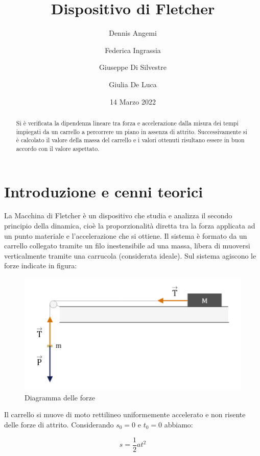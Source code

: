 \documentclass[11pt,a4paper]{article}
\title{Dispositivo di Fletcher}
\author[1]{Dennis Angemi}%
\author[1]{Federica Ingrassia}%
\author[1]{Giuseppe Di Silvestre}%
\author[1]{Giulia De Luca}%
\affil[1]{Dipartimento di Fisica e Astronomia ``Ettore Majorana'' - Università degli Studi di Catania}%
\date{14 Marzo 2022}
\begin{document}
\maketitle

\begin{abstract}
   
Si è verificata la dipendenza lineare tra forza e accelerazione dalla misura dei tempi impiegati da un carrello a percorrere un piano in assenza di attrito. Successivamente si è calcolato il valore della massa del carrello e i valori ottenuti risultano essere in buon accordo con il valore aspettato.
   
\end{abstract}

\section{Introduzione e cenni teorici}
La Macchina di Fletcher è un dispositivo che studia e analizza il secondo principio della dinamica, cioè la proporzionalità diretta tra la forza applicata ad un punto materiale e l'accelerazione che si ottiene.
Il sistema è formato da un carrello collegato tramite un filo inestensibile ad una massa, libera di muoversi verticalmente tramite una carrucola (considerata ideale).
Sul sistema agiscono le forze indicate in figura:

\begin{figure}[H]
\includegraphics[scale=0.3]{force-diagram.png}
\centering
\caption{Diagramma delle forze}
\label{fig:forze}
\end{figure}

Il carrello si muove di moto rettilineo uniformemente accelerato e non risente delle forze di attrito.
Considerando $s_0=0$ e $t_0=0$ abbiamo:

\begin{equation}
    s=\frac{1}{2}at^2
\end{equation}
\end{document}

